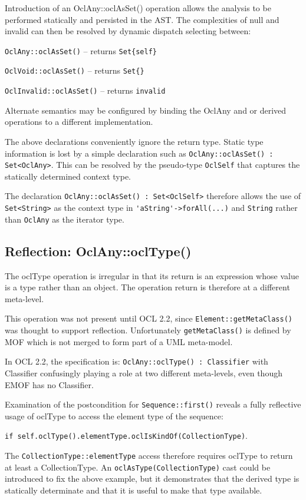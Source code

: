 \documentclass{eceasst}
\begin{document}
Introduction of an OclAny::oclAsSet() operation allows the analysis to be performed statically and persisted in the AST. The complexities of null and invalid can then be resolved by dynamic dispatch selecting between:

\verb|OclAny::oclAsSet()| -- returns \verb|Set{self}|

\verb|OclVoid::oclAsSet()| -- returns \verb|Set{}|

\verb|OclInvalid::oclAsSet()| -- returns \verb|invalid|

Alternate semantics may be configured by binding the OclAny and or derived operations to a different implementation.

The above declarations conveniently ignore the return type. Static type information is lost by a simple declaration such as \verb!OclAny::oclAsSet() : Set<OclAny>!. This can be resolved by the pseudo-type \verb!OclSelf! that captures the statically determined context type.

The declaration \verb!OclAny::oclAsSet() : Set<OclSelf>! therefore allows the use of \verb|Set<String>| as the context type in \verb|'aString'->forAll(...)| and  \verb|String| rather than \verb|OclAny| as the iterator type.

\subsection{Reflection: OclAny::oclType()}

The oclType operation is irregular in that its return is an expression whose value is a type rather than an object. The operation return is therefore at a different meta-level.

This operation was not present until OCL 2.2, since \verb!Element::getMetaClass()! was  thought to support reflection. Unfortunately \verb!getMetaClass()! is defined by MOF which is not merged to form part of a UML meta-model.

In OCL 2.2, the specification is: \verb!OclAny::oclType() : Classifier! with Classifier confusingly playing a role at two different meta-levels, even though EMOF has no Classifier.

Examination of the postcondition for \verb|Sequence::first()| reveals a fully reflective usage of oclType to access the element type of the sequence:

\verb|if self.oclType().elementType.oclIsKindOf(CollectionType)|. 

The \verb|CollectionType::elementType| access therefore requires oclType to return at least a CollectionType. An \verb|oclAsType(CollectionType)| cast could be introduced to fix the above example, but it demonstrates that the
derived type is statically determinate and that it is useful to make that type available.
\end{document}
